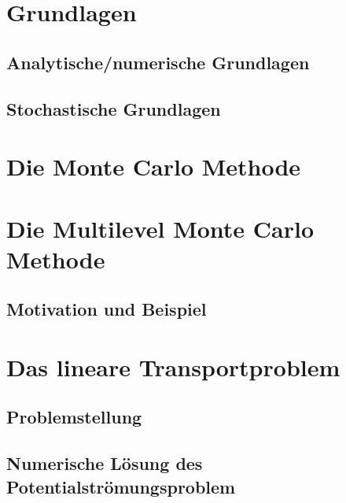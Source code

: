 \documentclass[12pt,a4paper]{scrartcl}
\theoremstyle{definition}
\numberwithin{equation}{section}
\begin{document}
\section{Grundlagen}
\subsection{Analytische/numerische Grundlagen}

\newpage  %
\subsection{Stochastische Grundlagen}

\newpage  %
\section{Die Monte Carlo Methode}
\label{MC}

\newpage  %
\section{Die Multilevel Monte Carlo Methode}
\label{MLMC}
\subsection{Motivation und Beispiel}


\newpage  %

\section{Das lineare Transportproblem}
\label{TP}
\subsection{Problemstellung}
 
 \newpage  %
\subsection{Numerische Lösung des Potentialströmungsproblem}

\newpage  %
\end{document}
